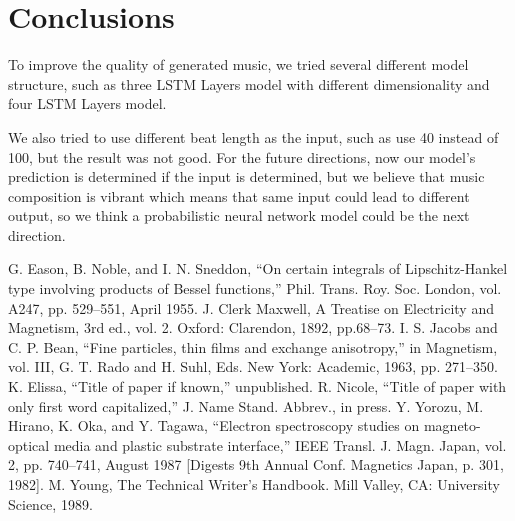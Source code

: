 \documentclass[conference]{IEEEtran}
\begin{document}
\section{Conclusions}
To improve the quality of generated music, we tried several different model structure, such as three LSTM Layers model with different dimensionality and four LSTM Layers model.

We also tried to use different beat length as the input, such as use 40 instead of 100, but the result was not good.						
For the future directions, now our model's prediction is determined if the input is determined, but we believe that music composition is vibrant which means that same input could lead to different output, so we think a probabilistic neural network model could be the next direction.

\begin{thebibliography}{00}
 G. Eason, B. Noble, and I. N. Sneddon, ``On certain integrals of Lipschitz-Hankel type involving products of Bessel functions,'' Phil. Trans. Roy. Soc. London, vol. A247, pp. 529--551, April 1955.
 J. Clerk Maxwell, A Treatise on Electricity and Magnetism, 3rd ed., vol. 2. Oxford: Clarendon, 1892, pp.68--73.
 I. S. Jacobs and C. P. Bean, ``Fine particles, thin films and exchange anisotropy,'' in Magnetism, vol. III, G. T. Rado and H. Suhl, Eds. New York: Academic, 1963, pp. 271--350.
 K. Elissa, ``Title of paper if known,'' unpublished.
 R. Nicole, ``Title of paper with only first word capitalized,'' J. Name Stand. Abbrev., in press.
 Y. Yorozu, M. Hirano, K. Oka, and Y. Tagawa, ``Electron spectroscopy studies on magneto-optical media and plastic substrate interface,'' IEEE Transl. J. Magn. Japan, vol. 2, pp. 740--741, August 1987 [Digests 9th Annual Conf. Magnetics Japan, p. 301, 1982].
 M. Young, The Technical Writer's Handbook. Mill Valley, CA: University Science, 1989.
\end{thebibliography}
\vspace{12pt}
\end{document}
